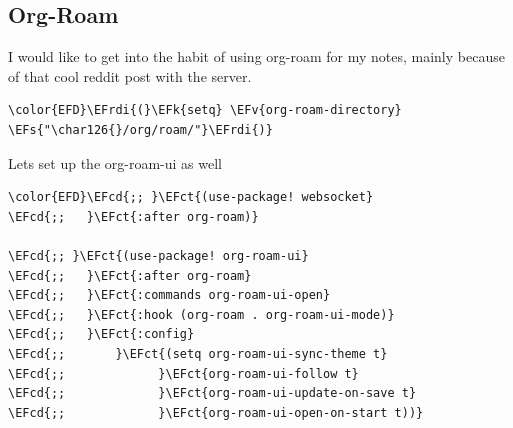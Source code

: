 \documentclass{scrartcl}
\newcommand{\EFk}[1]{\textcolor{EFk}{#1}} %
\newcommand{\EFs}[1]{\textcolor{EFs}{#1}} %
\newcommand{\EFct}[1]{\textcolor{EFct}{#1}} %
\newcommand{\EFv}[1]{\textcolor{EFv}{#1}} %
\newcommand{\EFcd}[1]{\textcolor{EFcd}{#1}} %
\newcommand{\EFrdi}[1]{#1} %
\begin{document}
\subsection{Org-Roam}
\label{sec:org0fd9082}
I would like to get into the habit of using org-roam for my notes, mainly because of that cool reddit post with the server.
\begin{Code}
\begin{Verbatim}[]
\color{EFD}\EFrdi{(}\EFk{setq} \EFv{org-roam-directory} \EFs{"\char126{}/org/roam/"}\EFrdi{)}
\end{Verbatim}
\end{Code}

Lets set up the org-roam-ui as well
\begin{Code}
\begin{Verbatim}[]
\color{EFD}\EFcd{;; }\EFct{(use-package! websocket}
\EFcd{;;   }\EFct{:after org-roam)}

\EFcd{;; }\EFct{(use-package! org-roam-ui}
\EFcd{;;   }\EFct{:after org-roam}
\EFcd{;;   }\EFct{:commands org-roam-ui-open}
\EFcd{;;   }\EFct{:hook (org-roam . org-roam-ui-mode)}
\EFcd{;;   }\EFct{:config}
\EFcd{;;       }\EFct{(setq org-roam-ui-sync-theme t}
\EFcd{;;             }\EFct{org-roam-ui-follow t}
\EFcd{;;             }\EFct{org-roam-ui-update-on-save t}
\EFcd{;;             }\EFct{org-roam-ui-open-on-start t))}
\end{Verbatim}
\end{Code}
\end{document}

